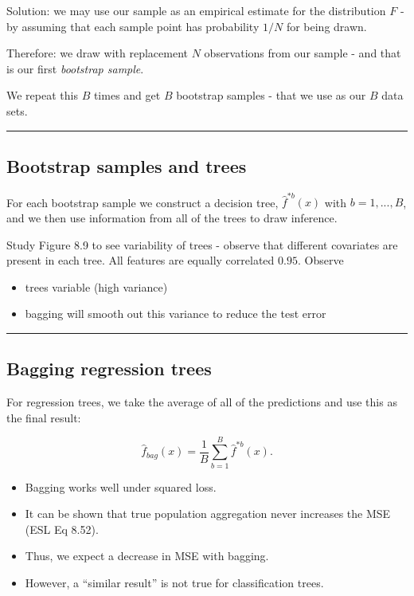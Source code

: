 \documentclass[
  letterpaper,
  DIV=11,
  numbers=noendperiod]{scrartcl}
\providecommand{\tightlist}{%
  \setlength{\itemsep}{0pt}\setlength{\parskip}{0pt}}\usepackage{longtable,booktabs,array}
\begin{document}
Solution: we may use our sample as an empirical estimate for the
distribution \(F\) - by assuming that each sample point has probability
\(1/N\) for being drawn.

Therefore: we draw with replacement \(N\) observations from our sample -
and that is our first \emph{bootstrap sample}.

We repeat this \(B\) times and get \(B\) bootstrap samples - that we use
as our \(B\) data sets.

\begin{center}\rule{0.5\linewidth}{0.5pt}\end{center}

\hypertarget{bootstrap-samples-and-trees}{%
\subsection{Bootstrap samples and
trees}\label{bootstrap-samples-and-trees}}

For each bootstrap sample we construct a decision tree,
\(\hat{f}^{*b}(x)\) with \(b=1,...,B\), and we then use information from
all of the trees to draw inference.

Study Figure 8.9 to see variability of trees - observe that different
covariates are present in each tree. All features are equally correlated
\(0.95\). Observe

\begin{itemize}
\tightlist
\item
  trees variable (high variance)
\item
  bagging will smooth out this variance to reduce the test error
\end{itemize}

\begin{center}\rule{0.5\linewidth}{0.5pt}\end{center}

\hypertarget{bagging-regression-trees}{%
\subsection{Bagging regression trees}\label{bagging-regression-trees}}

For regression trees, we take the average of all of the predictions and
use this as the final result:

\[
\hat{f}_{bag}(x)=\frac{1}{B}\sum_{b=1}^B \hat{f}^{*b}(x).
\]

\begin{itemize}
\tightlist
\item
  Bagging works well under squared loss.
\item
  It can be shown that true population aggregation never increases the
  MSE (ESL Eq 8.52).
\item
  Thus, we expect a decrease in MSE with bagging.
\item
  However, a ``similar result'' is not true for classification trees.
\end{itemize}
\end{document}
